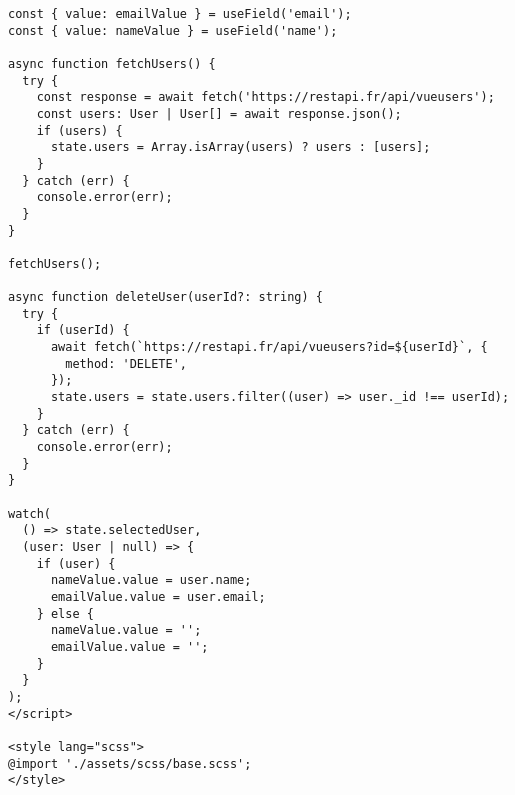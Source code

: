 \begin{verbatim}
const { value: emailValue } = useField('email');
const { value: nameValue } = useField('name');

async function fetchUsers() {
  try {
    const response = await fetch('https://restapi.fr/api/vueusers');
    const users: User | User[] = await response.json();
    if (users) {
      state.users = Array.isArray(users) ? users : [users];
    }
  } catch (err) {
    console.error(err);
  }
}

fetchUsers();

async function deleteUser(userId?: string) {
  try {
    if (userId) {
      await fetch(`https://restapi.fr/api/vueusers?id=${userId}`, {
        method: 'DELETE',
      });
      state.users = state.users.filter((user) => user._id !== userId);
    }
  } catch (err) {
    console.error(err);
  }
}

watch(
  () => state.selectedUser,
  (user: User | null) => {
    if (user) {
      nameValue.value = user.name;
      emailValue.value = user.email;
    } else {
      nameValue.value = '';
      emailValue.value = '';
    }
  }
);
</script>

<style lang="scss">
@import './assets/scss/base.scss';
</style>
\end{verbatim} 






